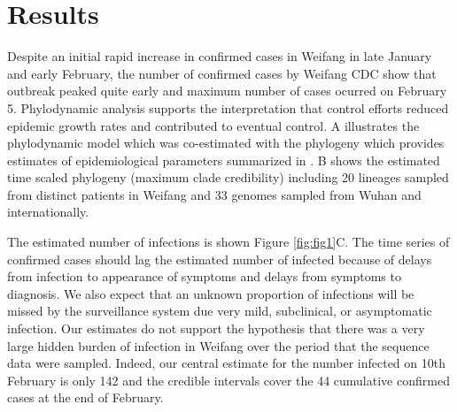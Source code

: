 \documentclass[9pt,lineno,onehalfspacing]{elife}
\begin{document}
\section{Results}

Despite an initial rapid increase in confirmed cases in Weifang in late January and early February, the number of confirmed cases by Weifang CDC show that outbreak peaked quite early and maximum number of cases ocurred on February 5. 
Phylodynamic analysis supports the interpretation that control efforts reduced epidemic growth rates and contributed to eventual control. 
A illustrates the phylodynamic model which was co-estimated with the phylogeny which provides estimates of epidemiological parameters summarized in .
B shows the estimated time scaled phylogeny (maximum clade credibility) including 20 lineages sampled from distinct patients in Weifang and 33 genomes sampled from Wuhan and internationally. 


The estimated number of infections is shown Figure \ref{fig:fig1}C.
The time series of confirmed cases should lag the estimated number of infected because of delays from infection to appearance of symptoms and delays from symptoms to diagnosis. 
We also expect that an unknown proportion of infections will be missed by the surveillance system due very mild, subclinical, or asymptomatic infection. 
Our estimates do not support the hypothesis that there was a very large hidden burden of infection in Weifang over the period that the sequence data were sampled. 
Indeed, our central estimate for the number infected on 10th February is only 142 and the credible intervals cover the 44 cumulative confirmed cases at the end of February. 
\end{document}

